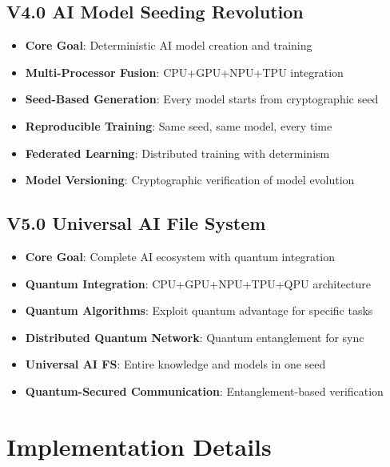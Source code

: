 \documentclass[12pt,a4paper]{article}
\begin{document}
\subsection{V4.0 AI Model Seeding Revolution}
\begin{itemize}
    \item \textbf{Core Goal}: Deterministic AI model creation and training
    \item \textbf{Multi-Processor Fusion}: CPU+GPU+NPU+TPU integration
    \item \textbf{Seed-Based Generation}: Every model starts from cryptographic seed
    \item \textbf{Reproducible Training}: Same seed, same model, every time
    \item \textbf{Federated Learning}: Distributed training with determinism
    \item \textbf{Model Versioning}: Cryptographic verification of model evolution
\end{itemize}

\subsection{V5.0 Universal AI File System}
\begin{itemize}
    \item \textbf{Core Goal}: Complete AI ecosystem with quantum integration
    \item \textbf{Quantum Integration}: CPU+GPU+NPU+TPU+QPU architecture
    \item \textbf{Quantum Algorithms}: Exploit quantum advantage for specific tasks
    \item \textbf{Distributed Quantum Network}: Quantum entanglement for sync
    \item \textbf{Universal AI FS}: Entire knowledge and models in one seed
    \item \textbf{Quantum-Secured Communication}: Entanglement-based verification
\end{itemize}

\newpage

\section{Implementation Details}
\end{document}
